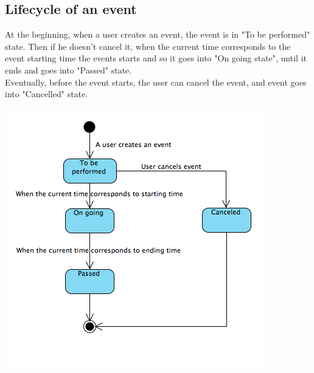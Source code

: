 \documentclass[12pt]{book}
\begin{document}
\subsection{Lifecycle of an event}
At the beginning, when a user creates an event, the event is in "To be performed" state. Then if he doesn't cancel it, when the current time corresponds to the event starting time the events starts and so it goes into "On going state", until it ends and goes into "Passed" state.\\ Eventually, before the event starts, the user can cancel the event, and event goes into "Cancelled" state. \\
\begin{center}
\includegraphics[scale=0.8]{eventSCD}\\
\end{center}
\end{document}
